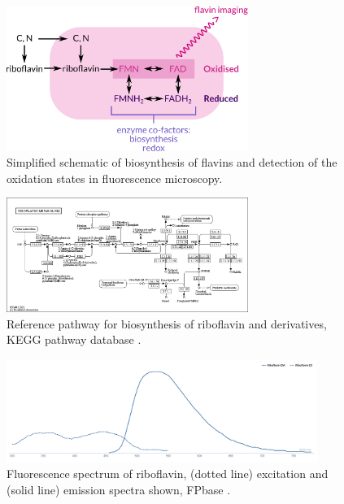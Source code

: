 
\begin{figure}
  \centering
  \includegraphics[width=0.7\textwidth]{flavin-cell-schematic}
  \caption{
    Simplified schematic of biosynthesis of flavins and detection of the oxidation states in fluorescence microscopy.
    }
  \label{fig:intro-flavin-schematic}
\end{figure}

\begin{figure}
  \centering
  \includegraphics[width=0.7\textwidth]{kegg-flavin}
  \caption{
    Reference pathway for biosynthesis of riboflavin and derivatives, KEGG pathway database \citep{kanehisaKEGGTaxonomybasedAnalysis2023}.
    }
  \label{fig:intro-flavin-kegg}
\end{figure}

\begin{figure}
  \centering
  \includegraphics[width=0.9\textwidth]{fpbase-riboflavin}
  \caption{
    Fluorescence spectrum of riboflavin, (dotted line) excitation and (solid line) emission spectra shown, FPbase \citep{lambertUsingFPbaseFluorescent2023}.
    }
  \label{fig:intro-flavin-spectra}
\end{figure}

